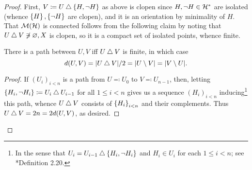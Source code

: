 \documentclass[reqno]{amsart}
\begin{document}
    \begin{proof}
        First, $V\coloneqq U\bigtriangleup\left\{H,\lnot H\right\}$ as above is clopen since $H,\lnot H\in\mathcal{H}^\ast$ are isolated (whence $\left\{H\right\},\left\{\lnot H\right\}$ are clopen), and it is an orientation by minimality of $H$. That $\mathcal{M}(\mathcal{H})$ is connected follows from the following claim by noting that $U\bigtriangleup V\not\ni\varnothing,X$ is clopen, so it is a compact set of isolated points, whence finite.
        \begin{center}
            \begin{minipage}{0.95\textwidth}
                \begin{claim*}
                    There is a path between $U,V$ iff $U\bigtriangleup V$ is finite, in which case
                    \begin{equation*}
                        d(U,V)=|U\bigtriangleup V|/2=|U\setminus V|=|V\setminus U|.
                    \end{equation*}
                \end{claim*}
                \begin{proof}
                    If $(U_i)_{i<n}$ is a path from $U\eqqcolon U_0$ to $V\eqqcolon U_{n-1}$, then, letting $\left\{H_i,\lnot H_i\right\}\coloneqq U_i\bigtriangleup U_{i-1}$ for all $1\leq i<n$ gives us a sequence $(H_i)_{i<n}$ inducing\footnote{In the sense that $U_i=U_{i-1}\bigtriangleup\left\{H_i,\lnot H_i\right\}$ and $H_i\in U_i$ for each $1\leq i<n$; see \cite{Tse20}*{Definition 2.20}.} this path, whence $U\bigtriangleup V$ consists of $\left\{H_i\right\}_{i<n}$ and their complements. Thus $U\bigtriangleup V=2n=2d(U,V)$, as desired.


\end{proof}
\end{minipage}
\end{center}
\end{proof}
\end{document}
